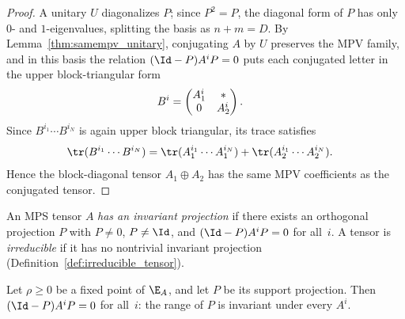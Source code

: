 \begin{proof}
    \leanok
    A unitary $U$ diagonalizes $P$; since $P^2=P$, the diagonal form of $P$
    has only $0$- and $1$-eigenvalues, splitting the basis as $n+m=D$.
    By Lemma~\ref{thm:samempv_unitary}, conjugating $A$ by $U$ preserves the
    MPV family, and in this basis the relation $(\Id-P)A^iP=0$ puts each
    conjugated letter in the upper block-triangular form
    \begin{align}
        B^i
         & =
        \begin{pmatrix}
            A_1^i & *     \\
            0     & A_2^i
        \end{pmatrix}.
        \notag
    \end{align}
    Since $B^{i_1}\cdots B^{i_N}$ is again upper block triangular, its trace
    satisfies
    \begin{align}
        \tr(B^{i_1}\cdots B^{i_N})
         & =
        \tr(A_1^{i_1}\cdots A_1^{i_N})
        +\tr(A_2^{i_1}\cdots A_2^{i_N}).
        \label{eq:canonical_two_block_trace}
    \end{align}
    Hence the block-diagonal tensor $A_1\oplus A_2$ has the same MPV
    coefficients as the conjugated tensor.
\end{proof}


\begin{definition}\label{def:has_inv_proj}
    \leanok
    An MPS tensor $A$ \emph{has an invariant projection} if there exists an
    orthogonal projection $P$ with $P\neq0$, $P\neq\Id$, and
    $(\Id-P)A^iP=0$ for all~$i$. A tensor is \emph{irreducible} if it has
    no nontrivial invariant projection (Definition~\ref{def:irreducible_tensor}).
\end{definition}

\begin{lemma}\label{thm:fp_inv_proj}
    \leanok
    Let $\rho\ge0$ be a fixed point of $\E_A$, and let $P$ be its support
    projection. Then $(\Id-P)A^iP=0$ for all~$i$: the range of $P$ is
    invariant under every $A^i$.
\end{lemma}

